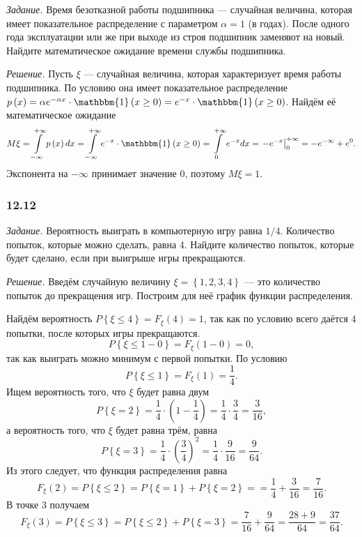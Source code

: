\textit{Задание.} Время безотказной работы подшипника --- случайная величина, которая имеет показательное распределение с параметром $ \alpha = 1$ (в годах).
После одного года эксплуатации или же при выходе из строя подшипник заменяют на новый.
Найдите математическое ожидание времени службы подшипника.

\textit{Решение.} Пусть $ \xi $ --- случайная величина, которая характеризует время работы подшипника.
По условию она имеет показательное распределение
$p \left( x \right) =
\alpha e^{- \alpha x} \cdot \mathbbm{1} \left( x \geq 0 \right) =
e^{-x} \cdot \mathbbm{1} \left( x \geq 0 \right) $.
Найдём её математическое ожидание
$$M \xi =
\int \limits_{- \infty }^{+ \infty } p \left( x \right) dx =
\int \limits_{- \infty }^{+ \infty } e^{-x} \cdot \mathbbm{1} \left( x \geq 0 \right) =
\int \limits_0^{+ \infty } e^{-x} dx =
\left. - e^{-x} \right|_0^{+ \infty } =
-e^{- \infty } + e^0.$$
Экспонента на $- \infty $ принимает значение 0, поэтому $M \xi = 1$.

\subsubsection*{12.12}

\textit{Задание.} Вероятность выиграть в компьютерную игру равна $1/4$.
Количество попыток, которые можно сделать, равна 4.
Найдите количество попыток, которые будет сделано, если при выигрыше игры прекращаются.

\textit{Решение.} Введём случайную величину $ \xi = \left\{ 1, 2, 3, 4 \right\} $ --- это количество попыток до прекращения игр.
Построим для неё график функции распределения.

Найдём вероятность $P \left\{ \xi \leq 4 \right\} = F_{ \xi } \left( 4 \right) = 1$, так как по условию всего даётся 4 попытки, после которых игры прекращаются.
$$P \left\{ \xi \leq 1 - 0 \right\} =
F_{ \xi } \left( 1 - 0 \right) =
0,$$
так как выиграть можно минимум с первой попытки.
По условию
$$P \left\{ \xi \leq 1 \right\} =
F_{ \xi } \left( 1 \right) =
\frac{1}{4}.$$
Ищем вероятность того, что $ \xi $ будет равна двум
$$P \left\{ \xi = 2 \right\} =
\frac{1}{4} \cdot \left( 1 - \frac{1}{4} \right) =
\frac{1}{4} \cdot \frac{3}{4} =
\frac{3}{16},$$
а вероятность того, что $ \xi $ будет равна трём, равна
$$P \left\{ \xi = 3 \right\} =
\frac{1}{4} \cdot \left( \frac{3}{4} \right)^2 =
\frac{1}{4} \cdot \frac{9}{16} =
\frac{9}{64}.$$
Из этого следует, что функция распределения равна
$$F_{ \xi } \left( 2 \right) =
P \left\{ \xi \leq 2 \right\} =
P \left\{ \xi = 1 \right\} + P \left\{ \xi = 2 \right\} =
= \frac{1}{4} + \frac{3}{16} =
\frac{7}{16}.$$
В точке 3 получаем
$$F_{ \xi } \left( 3 \right) =
P \left\{ \xi \leq 3 \right\} =
P \left\{ \xi \leq 2 \right\} + P \left\{ \xi = 3 \right\} =
\frac{7}{16} + \frac{9}{64} =
\frac{28+9}{64} =
\frac{37}{64}.$$

